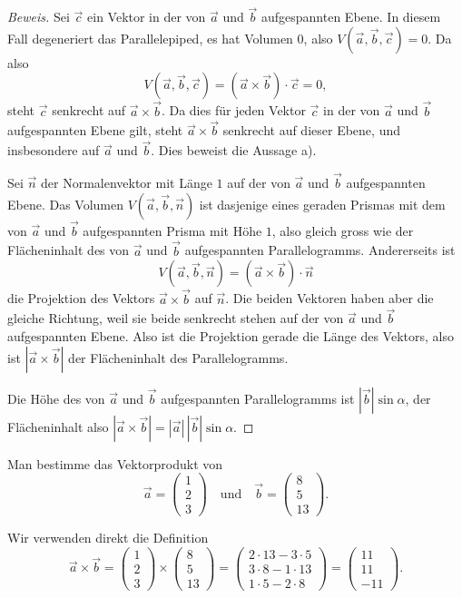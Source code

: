 \begin{proof}[Beweis]
Sei $\vec c$ ein Vektor in der von $\vec a$ und $\vec b$ aufgespannten
Ebene.
In diesem Fall degeneriert das Parallelepiped, es hat Volumen $0$,
also $V(\vec a,\vec b,\vec c)= 0$.
Da also
\[
V(\vec a,\vec b,\vec c)=(\vec a\times \vec b)\cdot \vec c=0,
\]
steht $\vec c$ senkrecht auf $\vec a\times\vec b$.
Da dies für jeden
Vektor $\vec c$ in der von $\vec a$ und $\vec b$ aufgespannten Ebene
gilt, steht $\vec a\times\vec b$ senkrecht auf dieser Ebene, und insbesondere
auf $\vec a$ und $\vec b$.
Dies beweist die Aussage a).

Sei $\vec n$ der Normalenvektor mit Länge $1$ auf der von $\vec a$ und
$\vec b$ aufgespannten Ebene.
Das Volumen $V(\vec a,\vec b,\vec n)$ ist
dasjenige eines geraden Prismas mit dem von $\vec a$ und $\vec b$
aufgespannten Prisma mit Höhe $1$, also gleich gross wie der
Flächeninhalt des von $\vec a$ und $\vec b$ aufgespannten Parallelogramms.
Andererseits ist
\[
V(\vec a,\vec b,\vec n)=(\vec a\times\vec b)\cdot \vec n
\]
die Projektion des Vektors $\vec a\times\vec b$ auf $\vec n$.
Die beiden
Vektoren haben aber die gleiche Richtung, weil sie beide senkrecht stehen
auf der von $\vec a$ und $\vec b$ aufgespannten Ebene.
Also ist die Projektion
gerade die Länge des Vektors, also ist
$|\vec a\times\vec b|$ der Flächeninhalt des Parallelogramms.

Die Höhe des von $\vec a$ und $\vec b$ aufgespannten Parallelogramms
ist $|\vec b|\sin \alpha$, der Flächeninhalt also
$|\vec a\times\vec b|=|\vec a|\,|\vec b|\sin\alpha.$
\end{proof}

\begin{beispiel}
Man bestimme das Vektorprodukt von
\[
\vec a=\begin{pmatrix}1\\2\\3\end{pmatrix}
\quad\text{und}\quad
\vec b=\begin{pmatrix}8\\5\\13\end{pmatrix}.
\]

\smallskip
{\parindent 0pt Wir verwenden direkt die Definition}
\[
\vec a\times \vec b=
\begin{pmatrix}1\\2\\3\end{pmatrix}
\times
\begin{pmatrix}8\\5\\13\end{pmatrix}
=
\begin{pmatrix}
2\cdot 13-3\cdot 5\\
3\cdot 8-1\cdot 13\\
1\cdot 5-2\cdot 8
\end{pmatrix}
=
\begin{pmatrix}
11\\
11\\
-11
\end{pmatrix}.
\]
\end{beispiel}

